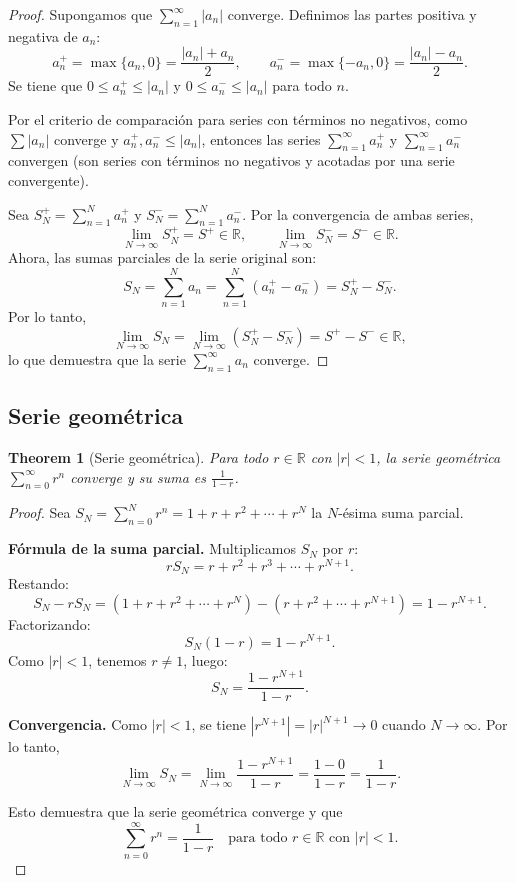 \documentclass[11pt,a4paper]{article}
\theoremstyle{plain}
\newtheorem{theorem}{Theorem}[section]
\theoremstyle{definition}
\begin{document}
\begin{proof}
Supongamos que $\sum_{n=1}^{\infty} |a_n|$ converge. Definimos las partes positiva y negativa de $a_n$:
\[
a_n^+ = \max\{a_n, 0\} = \frac{|a_n| + a_n}{2}, \qquad a_n^- = \max\{-a_n, 0\} = \frac{|a_n| - a_n}{2}.
\]
Se tiene que $0 \leq a_n^+ \leq |a_n|$ y $0 \leq a_n^- \leq |a_n|$ para todo $n$.

\medskip
Por el criterio de comparación para series con términos no negativos, como $\sum |a_n|$ converge y $a_n^+, a_n^- \leq |a_n|$, entonces las series $\sum_{n=1}^{\infty} a_n^+$ y $\sum_{n=1}^{\infty} a_n^-$ convergen (son series con términos no negativos y acotadas por una serie convergente).

\medskip
Sea $S_N^+ = \sum_{n=1}^{N} a_n^+$ y $S_N^- = \sum_{n=1}^{N} a_n^-$. Por la convergencia de ambas series,
\[
\lim_{N \to \infty} S_N^+ = S^+ \in \mathbb{R}, \qquad \lim_{N \to \infty} S_N^- = S^- \in \mathbb{R}.
\]
Ahora, las sumas parciales de la serie original son:
\[
S_N = \sum_{n=1}^{N} a_n = \sum_{n=1}^{N} (a_n^+ - a_n^-) = S_N^+ - S_N^-.
\]
Por lo tanto,
\[
\lim_{N \to \infty} S_N = \lim_{N \to \infty} (S_N^+ - S_N^-) = S^+ - S^- \in \mathbb{R},
\]
lo que demuestra que la serie $\sum_{n=1}^{\infty} a_n$ converge.
\end{proof}

\subsection{Serie geométrica}

\begin{theorem}[Serie geométrica]
Para todo $r \in \mathbb{R}$ con $|r| < 1$, la serie geométrica $\sum_{n=0}^{\infty} r^n$ converge y su suma es $\frac{1}{1-r}$.
\end{theorem}

\begin{proof}
Sea $S_N = \sum_{n=0}^{N} r^n = 1 + r + r^2 + \cdots + r^N$ la $N$-ésima suma parcial.

\medskip
\textbf{Fórmula de la suma parcial.} Multiplicamos $S_N$ por $r$:
\[
rS_N = r + r^2 + r^3 + \cdots + r^{N+1}.
\]
Restando:
\[
S_N - rS_N = (1 + r + r^2 + \cdots + r^N) - (r + r^2 + \cdots + r^{N+1}) = 1 - r^{N+1}.
\]
Factorizando:
\[
S_N(1 - r) = 1 - r^{N+1}.
\]
Como $|r| < 1$, tenemos $r \neq 1$, luego:
\[
S_N = \frac{1 - r^{N+1}}{1 - r}.
\]

\medskip
\textbf{Convergencia.} Como $|r| < 1$, se tiene $|r^{N+1}| = |r|^{N+1} \to 0$ cuando $N \to \infty$. Por lo tanto,
\[
\lim_{N \to \infty} S_N = \lim_{N \to \infty} \frac{1 - r^{N+1}}{1 - r} = \frac{1 - 0}{1 - r} = \frac{1}{1 - r}.
\]

\medskip
Esto demuestra que la serie geométrica converge y que
\[
\sum_{n=0}^{\infty} r^n = \frac{1}{1-r} \quad \text{para todo } r \in \mathbb{R} \text{ con } |r| < 1.
\]
\end{proof}
\end{document}
